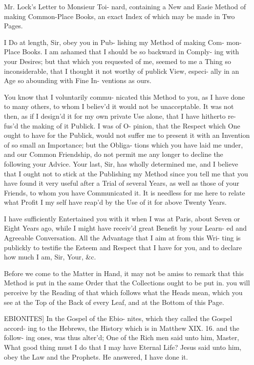 Mr. Lock's Letter to Monsieur Toi-
nard, containing a New and Easie
Method of making Common-Place
Books, an exact Index of which may
be made in Two Pages.

I Do at length, Sir, obey you in Pub-
lishing my Method of making Com-
mon-Place Books. I am ashamed
that I should be so backward in Comply-
ing with your Desires; but that which
you requested of me, seemed to me a
Thing so inconsiderable, that I thought
it not worthy of publick View, especi-
ally in an Age so abounding with Fine In-
ventions as ours.

You know that I voluntarily commu-
nicated this Method to you, as I have
done to many others, to whom I believ'd
it would not be unacceptable. It was
not then, as if I design'd it for my own
private Use alone, that I have hitherto re-
fus'd the making of it Publick. I was of O-
pinion, that the Respect which One ought
to have for the Publick, would not suffer
me to present it with an Invention of
so small an Importance; but the Obliga-
tions which you have laid me under, and
our Common Friendship, do not permit
me any longer to decline the following
your Advice. Your last, Sir, has wholly
determined me, and I believe that I ought
not to stick at the Publishing my Method
since you tell me that you have found
it very useful after a Trial of several
Years, as well as those of your Friends,
to whom you have Communicated it. It
is needless for me here to relate what
Profit I my self have reap'd by the Use
of it for above Twenty Years.

I have sufficiently Entertained you
with it when I was at Paris, about
Seven or Eight Years ago, while I might
have receiv'd great Benefit by your Learn-
ed and Agreeable Conversation. All the
Advantage that I aim at from this Wri-
ting is publickly to testifie the Esteem
and Respect that I have for you, and to
declare how much I am, Sir, Your, &c.

Before we come to the Matter in Hand,
it may not be amiss to remark that
this Method is put in the same Order
that the Collections ought to be put in. you
will perceive by the Reading of that which
follows what the Heads mean, which you see
at the Top of the Back of every Leaf, and at
the Bottom of this Page.

EBIONITES] In the Gospel of the Ebio-
nites, which they called the Gospel accord-
ing to the Hebrews, the History which
is in Matthew XIX. 16. and the follow-
ing ones, was thus alter'd; One of the Rich
men said unto him, Master, What good thing
must I do that I may have Eternal Life?
Jesus said unto him, obey the Law and the
Prophets. He answered, I have done it.

